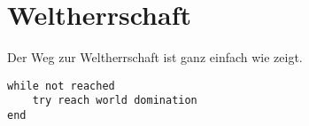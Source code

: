 \chapter{Weltherrschaft}
\label{chap:weltherrschaft}


Der Weg zur Weltherrschaft ist ganz einfach wie  zeigt.

\begin{lstlisting}[label=lst:weltherrschaft, caption={How to reach World domination}]
while not reached
    try reach world domination
end
\end{lstlisting}